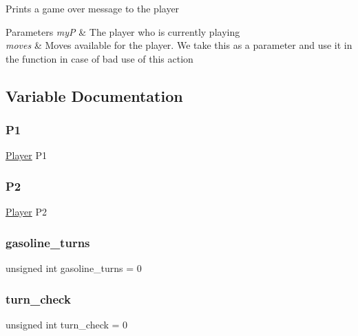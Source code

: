 Prints a game over message to the player 
\begin{DoxyParams}{Parameters}
{\em myP} & The player who is currently playing \\
\hline
{\em moves} & Moves available for the player. We take this as a parameter and use it in the function in case of bad use of this action \\
\hline
\end{DoxyParams}


\subsection{Variable Documentation}
\mbox{\label{group__game_gaccc5007b929ad581c10681547209a8e9}} 
\subsubsection{\texorpdfstring{P1}{P1}}
{\footnotesize\ttfamily \hyperlink{group__game_gac6f795d0d2e88ee469ddc704329e7cc3}{Player} P1\hspace{0.3cm}{\ttfamily [static]}}

\mbox{\label{group__game_ga7a9af78ed6216215319101be23aa592d}} 
\subsubsection{\texorpdfstring{P2}{P2}}
{\footnotesize\ttfamily \hyperlink{group__game_gac6f795d0d2e88ee469ddc704329e7cc3}{Player} P2\hspace{0.3cm}{\ttfamily [static]}}

\mbox{\label{group__game_gab559443974aa82448752226204355810}} 
\subsubsection{\texorpdfstring{gasoline\+\_\+turns}{gasoline\_turns}}
{\footnotesize\ttfamily unsigned int gasoline\+\_\+turns = 0\hspace{0.3cm}{\ttfamily [static]}}

\mbox{\label{group__game_ga5a8c0b139e420a30cda9ed86109502d7}} 
\subsubsection{\texorpdfstring{turn\+\_\+check}{turn\_check}}
{\footnotesize\ttfamily unsigned int turn\+\_\+check = 0\hspace{0.3cm}{\ttfamily [static]}}

